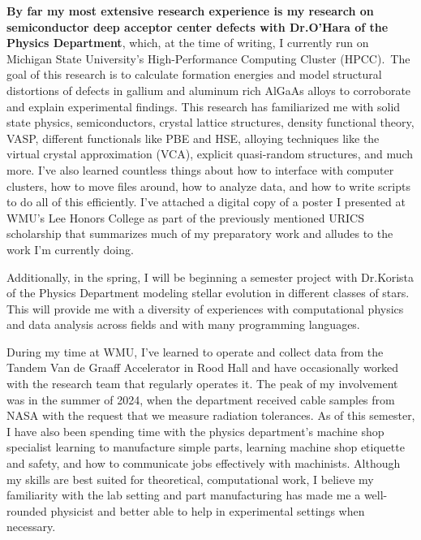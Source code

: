 \documentclass[11pt]{article}
\begin{document}
\textbf{By far my most extensive research experience is my research on semiconductor deep acceptor center defects with Dr.\@ O'Hara of the Physics Department}, which, at the time of writing, I currently run on Michigan State University's High-Performance Computing Cluster (HPCC).\ The goal of this research is to calculate formation energies and model structural distortions of defects in gallium and aluminum rich AlGaAs alloys to corroborate and explain experimental findings. This research has familiarized me with solid state physics, semiconductors, crystal lattice structures, density functional theory, VASP, different functionals like PBE and HSE, alloying techniques like the virtual crystal approximation (VCA), explicit quasi-random structures, and much more. I've also learned countless things about how to interface with computer clusters, how to move files around, how to analyze data, and how to write scripts to do all of this efficiently. I've attached a digital copy of a poster I presented at WMU's Lee Honors College as part of the previously mentioned URICS scholarship that summarizes much of my preparatory work and alludes to the work I'm currently doing.
\pagebreak

Additionally, in the spring, I will be beginning a semester project with Dr.\@ Korista of the Physics Department modeling stellar evolution in different classes of stars. This will provide me with a diversity of experiences with computational physics and data analysis across fields and with many programming languages.

During my time at WMU, I've learned to operate and collect data from the Tandem Van de Graaff Accelerator in Rood Hall and have occasionally worked with the research team that regularly operates it. The peak of my involvement was in the summer of 2024, when the department received cable samples from NASA with the request that we measure radiation tolerances. As of this semester, I have also been spending time with the physics department's machine shop specialist learning to manufacture simple parts, learning machine shop etiquette and safety, and how to communicate jobs effectively with machinists. Although my skills are best suited for theoretical, computational work, I believe my familiarity with the lab setting and part manufacturing has made me a well-rounded physicist and better able to help in experimental settings when necessary.
\end{document}
